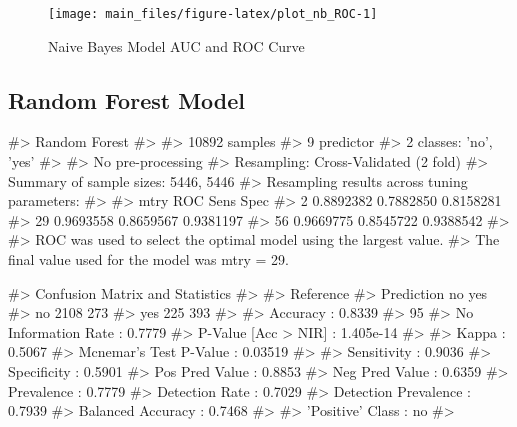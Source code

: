 \begin{Schunk}
\begin{figure}[H]

{\centering \texttt{[image: main\_files/figure-latex/plot\_nb\_ROC-1]} 

}

\caption[Naive Bayes Model AUC and ROC Curve]{Naive Bayes Model AUC and ROC Curve}\label{fig:plot_nb_ROC}
\end{figure}
\end{Schunk}

\hypertarget{random-forest-model}{%
\subsection{Random Forest Model}\label{random-forest-model}}

\begin{Schunk}
\begin{Soutput}
#> Random Forest 
#> 
#> 10892 samples
#>     9 predictor
#>     2 classes: 'no', 'yes' 
#> 
#> No pre-processing
#> Resampling: Cross-Validated (2 fold) 
#> Summary of sample sizes: 5446, 5446 
#> Resampling results across tuning parameters:
#> 
#>   mtry  ROC        Sens       Spec     
#>    2    0.8892382  0.7882850  0.8158281
#>   29    0.9693558  0.8659567  0.9381197
#>   56    0.9669775  0.8545722  0.9388542
#> 
#> ROC was used to select the optimal model using the largest value.
#> The final value used for the model was mtry = 29.
\end{Soutput}
\end{Schunk}

\begin{Schunk}
\begin{Soutput}
#> Confusion Matrix and Statistics
#> 
#>           Reference
#> Prediction   no  yes
#>        no  2108  273
#>        yes  225  393
#>                                           
#>                Accuracy : 0.8339          
#>                  95%
#>     No Information Rate : 0.7779          
#>     P-Value [Acc > NIR] : 1.405e-14       
#>                                           
#>                   Kappa : 0.5067          
#>  Mcnemar's Test P-Value : 0.03519         
#>                                           
#>             Sensitivity : 0.9036          
#>             Specificity : 0.5901          
#>          Pos Pred Value : 0.8853          
#>          Neg Pred Value : 0.6359          
#>              Prevalence : 0.7779          
#>          Detection Rate : 0.7029          
#>    Detection Prevalence : 0.7939          
#>       Balanced Accuracy : 0.7468          
#>                                           
#>        'Positive' Class : no              
#> 
\end{Soutput}
\end{Schunk}

